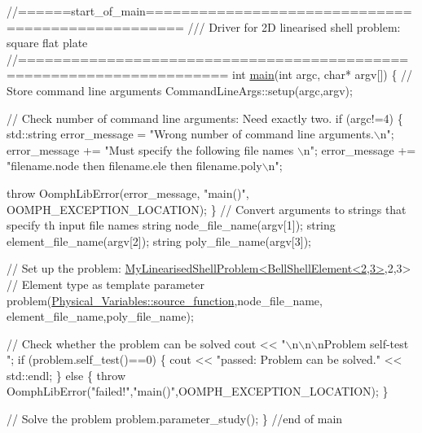  
\begin{DoxyCodeInclude}
\textcolor{comment}{//======start\_of\_main==================================================}
\textcolor{comment}{/// Driver for 2D linearised shell problem: square flat plate}
\textcolor{comment}{}\textcolor{comment}{//=====================================================================}
\textcolor{keywordtype}{int} \hyperlink{plate_8cc_a0ddf1224851353fc92bfbff6f499fa97}{main}(\textcolor{keywordtype}{int} argc, \textcolor{keywordtype}{char}* argv[])
\{
 \textcolor{comment}{// Store command line arguments}
 CommandLineArgs::setup(argc,argv);

 \textcolor{comment}{// Check number of command line arguments: Need exactly two.}
 \textcolor{keywordflow}{if} (argc!=4)
  \{
   std::string error\_message =
    \textcolor{stringliteral}{"Wrong number of command line arguments.\(\backslash\)n"};
   error\_message +=
    \textcolor{stringliteral}{"Must specify the following file names  \(\backslash\)n"};
   error\_message += 
    \textcolor{stringliteral}{"filename.node then filename.ele then filename.poly\(\backslash\)n"};

   \textcolor{keywordflow}{throw} OomphLibError(error\_message,
                       \textcolor{stringliteral}{"main()"},
                       OOMPH\_EXCEPTION\_LOCATION);
  \}
 \textcolor{comment}{// Convert arguments to strings that specify th input file names}
 \textcolor{keywordtype}{string} node\_file\_name(argv[1]);
 \textcolor{keywordtype}{string} element\_file\_name(argv[2]);
 \textcolor{keywordtype}{string} poly\_file\_name(argv[3]);

 \textcolor{comment}{// Set up the problem: }
 \hyperlink{classMyLinearisedShellProblem}{MyLinearisedShellProblem<BellShellElement<2,3>},2,3> \textcolor{comment}{//
      Element type as template parameter}
  problem(\hyperlink{namespacePhysical__Variables_a36f0d0dc5f8aa4eafd7c4d6fe943c4e8}{Physical\_Variables::source\_function},node\_file\_name,
      element\_file\_name,poly\_file\_name);
 
 
 \textcolor{comment}{// Check whether the problem can be solved}
 cout << \textcolor{stringliteral}{"\(\backslash\)n\(\backslash\)n\(\backslash\)nProblem self-test "};
 \textcolor{keywordflow}{if} (problem.self\_test()==0)  
  \{
   cout << \textcolor{stringliteral}{"passed: Problem can be solved."} << std::endl;
  \}
 \textcolor{keywordflow}{else} 
  \{
   \textcolor{keywordflow}{throw} OomphLibError(\textcolor{stringliteral}{"failed!"},\textcolor{stringliteral}{"main()"},OOMPH\_EXCEPTION\_LOCATION);
  \}
  
 \textcolor{comment}{// Solve the problem}
 problem.parameter\_study();
\} \textcolor{comment}{//end of main}

\end{DoxyCodeInclude}




